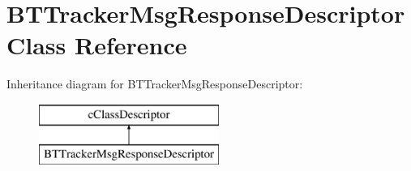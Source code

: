 \hypertarget{classBTTrackerMsgResponseDescriptor}{}\section{B\+T\+Tracker\+Msg\+Response\+Descriptor Class Reference}
\label{classBTTrackerMsgResponseDescriptor}
Inheritance diagram for B\+T\+Tracker\+Msg\+Response\+Descriptor\+:\begin{figure}[H]
\begin{center}
\leavevmode
\includegraphics[height=2.000000cm]{classBTTrackerMsgResponseDescriptor}
\end{center}
\end{figure}
